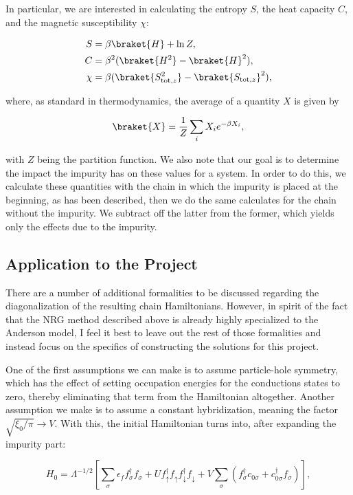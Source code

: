 In particular, we are interested in calculating the entropy $S$, the heat capacity $C$, and the magnetic susceptibility $\chi$:

\begin{align}
  S &= \beta\braket{H} + \ln Z, \\
  C &= \beta^2(\braket{H^2} - \braket{H}^2), \\
  \chi &= \beta(\braket{S_{\mathrm{tot},z}^2} - \braket{S_{\mathrm{tot},z}}^2),
\end{align}

where, as standard in thermodynamics, the average of a quantity $X$ is given by

\begin{equation}
  \braket{X} = \frac{1}{Z}\sum_i X_i e^{-\beta X_i},
\end{equation}

with $Z$ being the partition function. We also note that our goal is to determine the impact the impurity has on these values for a system. In order to do this, we calculate these quantities with the chain in which the impurity is placed at the beginning, as has been described, then we do the same calculates for the chain without the impurity. We subtract off the latter from the former, which yields only the effects due to the impurity.


\subsection{Application to the Project}\label{sec:application-to-project}

There are a number of additional formalities to be discussed regarding the diagonalization of the resulting chain Hamiltonians. However, in spirit of the fact that the NRG method described above is already highly specialized to the Anderson model, I feel it best to leave out the rest of those formalities and instead focus on the specifics of constructing the solutions for this project.

One of the first assumptions we can make is to assume particle-hole symmetry, which has the effect of setting occupation energies for the conductions states to zero, thereby eliminating that term from the Hamiltonian altogether. Another assumption we make is to assume a constant hybridization, meaning the factor $\sqrt{\xi_0/\pi} \rightarrow V$. With this, the initial Hamiltonian turns into, after expanding the impurity part:

\begin{equation}
  H_0 = \Lambda^{-1/2} \left[\sum_\sigma \epsilon_f f^\dagger_\sigma f_\sigma + Uf^\dagger_\uparrow f_\uparrow f^\dagger_\downarrow f_\downarrow  + V\sum_\sigma \left( f^\dagger_\sigma c_{0\sigma} + c^\dagger_{0\sigma}f_\sigma \right)\right],
\end{equation}

